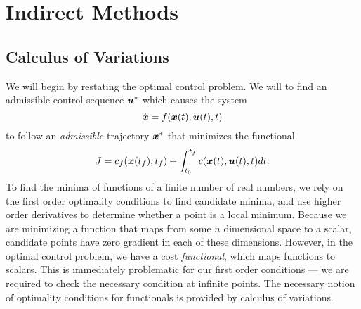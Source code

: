 \section{Indirect Methods}

\subsection{Calculus of Variations}

We will begin by restating the optimal control problem. We will to find an admissible control sequence $\bm{u}^*$ which causes the system 
\begin{equation}
    \dot{\bm{x}} = f(\bm{x}(t),\bm{u}(t),t)
\end{equation}
to follow an \textit{admissible} trajectory $\bm{x}^*$ that minimizes the functional 
\begin{equation}
    J = c_f(\bm{x}(t_f),t_f) + \int_{t_0}^{t_f} c(\bm{x}(t),\bm{u}(t),t) dt.
\end{equation}
To find the minima of functions of a finite number of real numbers, we rely on the first order optimality conditions to find candidate minima, and use higher order derivatives to determine whether a point is a local minimum. Because we are minimizing a function that maps from some $n$ dimensional space to a scalar, candidate points have zero gradient in each of these dimensions. However, in the optimal control problem, we have a cost \textit{functional}, which maps functions to scalars. This is immediately problematic for our first order conditions --- we are required to check the necessary condition at infinite points. The necessary notion of optimality conditions for functionals is provided by calculus of variations.

